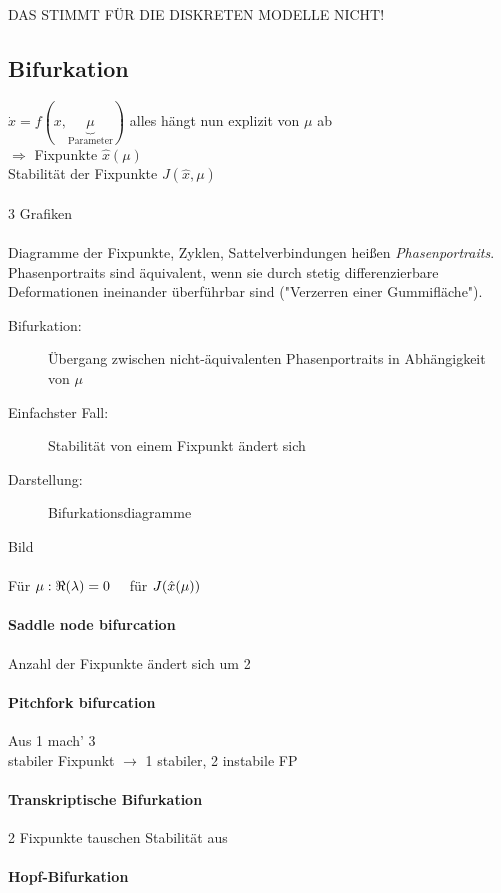 DAS STIMMT FÜR DIE DISKRETEN MODELLE NICHT!

\subsection{Bifurkation}
$ \dot{x} = f(x, \underbrace{\mu}_{\text{Parameter}}) $ \qquad 
alles hängt nun explizit von $  \mu $ ab \\
$ \Rightarrow $ Fixpunkte $ \hat{x}(\mu) $ \\
Stabilität der Fixpunkte $ J(\hat{x}, \mu) $ \\\\
3 Grafiken \\\\
Diagramme der Fixpunkte, Zyklen, Sattelverbindungen heißen \emph{Phasenportraits}. \\
Phasenportraits sind äquivalent, wenn sie durch stetig differenzierbare Deformationen ineinander überführbar sind ("Verzerren einer Gummifläche"). 
\begin{description}
    \item[Bifurkation:] Übergang zwischen nicht-äquivalenten Phasenportraits in Abhängigkeit von $\mu$
    \item[Einfachster Fall:] Stabilität von einem Fixpunkt ändert sich
    \item[Darstellung:] Bifurkationsdiagramme
\end{description}

Bild \\\\
Für $ \mu\*: \Re(\lambda) = 0 \quad $ für $ J(\hat{x}(\mu\*)) $
\paragraph{Saddle node bifurcation}
Anzahl der Fixpunkte ändert sich um 2
\paragraph{Pitchfork bifurcation}
Aus 1 mach' 3 \\
stabiler Fixpunkt $\rightarrow$ 1 stabiler, 2 instabile FP
\paragraph{Transkriptische Bifurkation}
2 Fixpunkte tauschen Stabilität aus
\paragraph{Hopf-Bifurkation}
